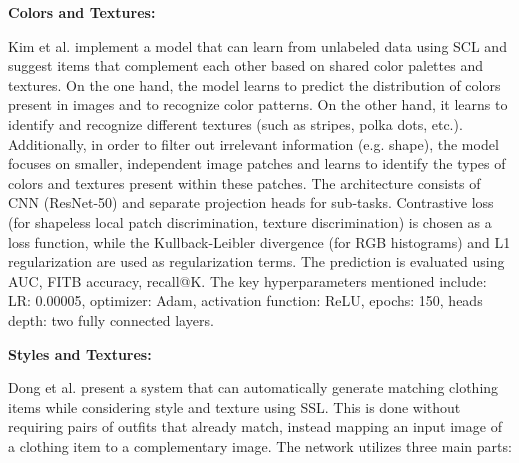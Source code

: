 \textbf{Colors and Textures:}

\vspace{0.5cm}

Kim et al. implement a model that can learn from unlabeled data using \acs{SCL} and suggest items that complement each other based on shared color palettes and textures. On the one hand, the model learns to predict the distribution of colors present in images and to recognize color patterns. On the other hand, it learns to identify and recognize different textures (such as stripes, polka dots, etc.). Additionally, in order to filter out irrelevant information (e.g. shape), the model focuses on smaller, independent image patches and learns to identify the types of colors and textures present within these patches. The architecture consists of \acs{CNN} (\acs{ResNet}-50) and separate projection heads for sub-tasks. Contrastive loss (for shapeless local patch discrimination, texture discrimination) is chosen as a loss function, while the Kullback-Leibler divergence (for RGB histograms) and L1 regularization are used as regularization terms. The prediction is evaluated using \acs{AUC}, \acs{FITB} accuracy, recall@K. The key hyperparameters mentioned include: \acs{LR}: 0.00005, optimizer: Adam, activation function: \acs{ReLU}, epochs: 150, heads depth: two fully connected layers. \cite[cf.]{kim_self-supervised_2020}

\vspace{0.5cm}

\textbf{Styles and Textures:}

\vspace{0.5cm}

Dong et al. present a system that can automatically generate matching clothing items while considering style and texture using \acs{SSL}. This is done without requiring pairs of outfits that already match, instead mapping an input image of a clothing item to a complementary image. The network utilizes three main parts: \cite[cf.]{dong_towards_2025}

